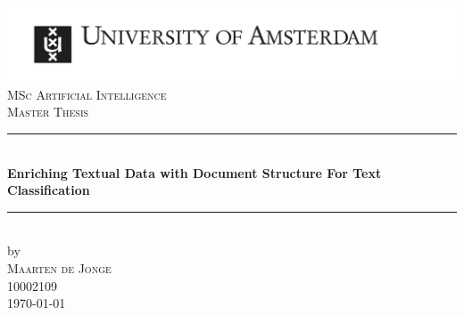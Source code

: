 \begin{titlepage}

\newcommand{\HRule}{\rule{\linewidth}{0.5mm}} %
\center %
 

\includegraphics[width=\linewidth]{figures/uvaeng}\\[2.5cm]
\textsc{\Large MSc Artificial Intelligence}\\[0.2cm]
\textsc{\Large Master Thesis}\\[0.5cm] 


\HRule \\[0.4cm]
{ \huge \bfseries Enriching Textual Data with Document Structure For Text
Classification}\\[0.4cm] %
\HRule \\[0.5cm]
 

by\\[0.2cm]
\textsc{\Large{Maarten de Jonge}}\\[0.2cm] %
10002109 \\[1cm]



{\Large \today}\\[1cm] %


\end{titlepage}
